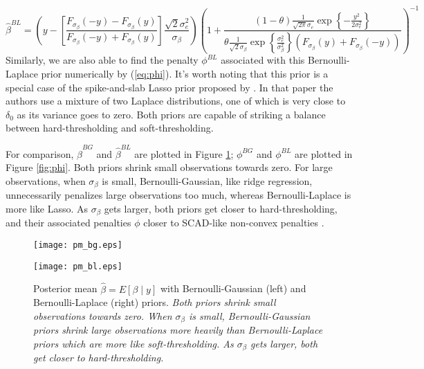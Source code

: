 \documentclass[11pt]{article}%
\numberwithin{equation}{section}
\theoremstyle{plain}
\begin{document}
$$
\hat\beta^{BL} = 
\left(y - \left[\frac{F_{\sigma_\beta}(-y) - F_{\sigma_\beta}(y)}{F_{\sigma_\beta}(-y) + F_{\sigma_\beta}(y)}\right]\frac{\sqrt{2}\sigma_e^2}{\sigma_\beta} \right)
\left(1 + 
\frac{
\left(1-\theta\right) 
\frac{1}{\sqrt{2\pi}\sigma_e}\exp\left\{-\frac{y^2}{2\sigma_e^2}\right\}
}
{
\theta
\frac{1}{\sqrt{2}\sigma_\beta}
\exp\left\{\frac{\sigma_e^2}{\sigma_\beta^2}\right\}
\left(F_{\sigma_\beta}(y) + F_{\sigma_\beta}(-y)\right)
}
\right)^{-1}
$$
Similarly, we are also able to find the penalty $\phi^{BL}$ associated with this Bernoulli-Laplace prior numerically by (\ref{eq:phi}). It's worth noting that this prior is a special case of the spike-and-slab Lasso prior proposed by \cite{rockova2016}. In that paper the authors use a mixture of two Laplace distributions, one of which is very close to $\delta_0$ as its variance goes to zero. Both priors are capable of striking a balance between hard-thresholding and soft-thresholding.

For comparison, $\hat\beta^{BG}$ and $\hat\beta^{BL}$ are plotted in Figure \ref{fig:pm}; $\phi^{BG}$ and $\phi^{BL}$ are plotted in Figure \ref{fig:phi}.  Both priors shrink small observations towards zero.  For large observations, when $\sigma_\beta$ is small, Bernoulli-Gaussian, like ridge regression, unnecessarily penalizes large observations too much, whereas Bernoulli-Laplace is more like Lasso.  As $\sigma_\beta$ gets larger, both priors get closer to hard-thresholding, and their associated penalties $\phi$ closer to SCAD-like non-convex penalties \citep{fan2001}.




\begin{figure}[!htb]
\centering
   \begin{minipage}{0.49\textwidth}
     \texttt{[image: pm\_bg.eps]}
   \end{minipage}
   \begin {minipage}{0.49\textwidth}
     \texttt{[image: pm\_bl.eps]}
   \end{minipage}
  \caption{Posterior mean $\hat\beta = E\left[\beta \mid y\right]$ with Bernoulli-Gaussian (left) and Bernoulli-Laplace (right) priors.  \textit{Both priors shrink small observations towards zero.  When $\sigma_\beta$ is small, Bernoulli-Gaussian priors shrink large observations more heavily than Bernoulli-Laplace priors which are more like soft-thresholding.  As $\sigma_\beta$ gets larger, both get closer to hard-thresholding.}}
\label{fig:pm}
\end{figure}
\end{document}
